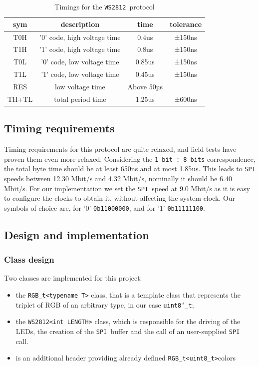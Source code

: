 \documentclass[10pt,a4]{article}
\newcommand{\ws}{\texttt{WS2812 }}
\newcommand{\spi}{\texttt{SPI }}
\newcommand{\type}{\char`_t}
\begin{document}
\begin{table}
\begin{tabular}{|c|c|c|c|}
\hline
sym & description & time & tolerance \\
\hline
T0H & '0'  code, high voltage time & 0.4us &±150ns \\
T1H & '1'  code, high voltage time & 0.8us &±150ns \\
T0L & '0'  code, low voltage time  & 0.85us& ±150ns \\
T1L & '1'  code, low voltage time  & 0.45us &±150ns\\
RES & low voltage time & Above 50µs& \\
TH+TL & total period time & 1.25us & ±600ns \\
\hline
\end{tabular}
\caption{\label{tab:timings}Timings for the \ws protocol}
\end{table}
\FloatBarrier %
\subsection{Timing requirements}



Timing requirements for this protocol are quite relaxed, and field tests \cite{cpldcpu} have proven them even more relaxed. Considering the \texttt{1 bit : 8 bits} correspondence, the total byte time should be at least 650ns and at most 1.85us. This leads to \spi speeds between 12.30 Mbit/s and 4.32 Mbit/s, nominally it should be 6.40 Mbit/s. 
For our implementation we set the \spi speed at 9.0 Mbit/s as it is easy to configure the clocks to obtain it, without affecting the system clock. Our symbols of choice are, for '0' \texttt{0b11000000}, and for '1' \texttt{0b11111100}.

\subsection{Design and implementation}
\subsubsection{Class design}
Two classes are implemented for this project:
\begin{itemize}
    \item 
the \lstinline{RGB_t<typename T>} class, that is a template class that represents the triplet of RGB of an arbitrary type, in our case \texttt{uint8\type};
    \item the \lstinline{WS2812<int LENGTH>} class, which is responsible for the driving of the LEDs, the creation of the \spi buffer and the call of an user-supplied \spi call.
    \item is an additional header providing already defined \lstinline{RGB_t<uint8_t>}colors
\end{itemize}
\end{document}
